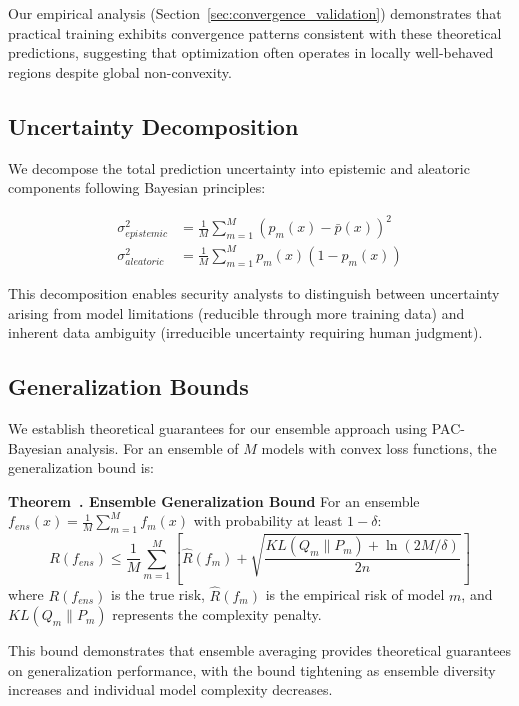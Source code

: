 \documentclass[journal]{IEEEtran}
\newcounter{theorem}
\newenvironment{theorem}[1][]{\refstepcounter{theorem}\par\medskip
   \noindent \textbf{Theorem~\thetheorem. #1} \rmfamily}{\medskip}
\begin{document}
Our empirical analysis (Section~\ref{sec:convergence_validation}) demonstrates that practical training exhibits convergence patterns consistent with these theoretical predictions, suggesting that optimization often operates in locally well-behaved regions despite global non-convexity.

\subsection{Uncertainty Decomposition}

We decompose the total prediction uncertainty into epistemic and aleatoric components following Bayesian principles:

\begin{align}
\sigma_{epistemic}^2 &= \frac{1}{M} \sum_{m=1}^M (p_m(x) - \bar{p}(x))^2 \\
\sigma_{aleatoric}^2 &= \frac{1}{M} \sum_{m=1}^M p_m(x)(1-p_m(x))
\end{align}

This decomposition enables security analysts to distinguish between uncertainty arising from model limitations (reducible through more training data) and inherent data ambiguity (irreducible uncertainty requiring human judgment).

\subsection{Generalization Bounds}

We establish theoretical guarantees for our ensemble approach using PAC-Bayesian analysis. For an ensemble of $M$ models with convex loss functions, the generalization bound is:

\begin{theorem}[Ensemble Generalization Bound]
For an ensemble $f_{ens}(x) = \frac{1}{M} \sum_{m=1}^M f_m(x)$ with probability at least $1-\delta$:
\begin{equation}
R(f_{ens}) \leq \frac{1}{M} \sum_{m=1}^M \left[ \hat{R}(f_m) + \sqrt{\frac{KL(Q_m \| P_m) + \ln(2M/\delta)}{2n}} \right]
\end{equation}
where $R(f_{ens})$ is the true risk, $\hat{R}(f_m)$ is the empirical risk of model $m$, and $KL(Q_m \| P_m)$ represents the complexity penalty.
\end{theorem}

This bound demonstrates that ensemble averaging provides theoretical guarantees on generalization performance, with the bound tightening as ensemble diversity increases and individual model complexity decreases.
\end{document}
